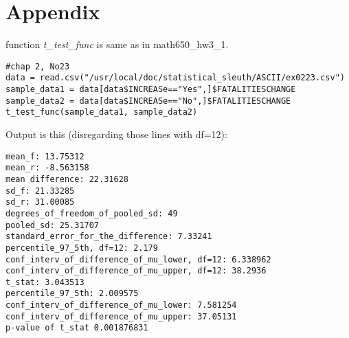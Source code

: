 \documentclass[a4paper,10pt]{article}
\begin{document}
\section{Appendix}
\label{appendix}
function \emph{t\_test\_func} is same as in math650\_hw3\_1.
\begin{verbatim}
#chap 2, No23
data = read.csv("/usr/local/doc/statistical_sleuth/ASCII/ex0223.csv")
sample_data1 = data[data$INCREASe=="Yes",]$FATALITIESCHANGE
sample_data2 = data[data$INCREASe=="No",]$FATALITIESCHANGE
t_test_func(sample_data1, sample_data2)
\end{verbatim}

Output is this (disregarding those lines with df=12):
\begin{verbatim}
mean_f: 13.75312
mean_r: -8.563158
mean difference: 22.31628
sd_f: 21.33285
sd_r: 31.00085
degrees_of_freedom_of_pooled_sd: 49
pooled_sd: 25.31707
standard_error_for_the_difference: 7.33241
percentile_97_5th, df=12: 2.179
conf_interv_of_difference_of_mu_lower, df=12: 6.338962
conf_interv_of_difference_of_mu_upper, df=12: 38.2936
t_stat: 3.043513
percentile_97_5th: 2.009575
conf_interv_of_difference_of_mu_lower: 7.581254
conf_interv_of_difference_of_mu_upper: 37.05131
p-value of t_stat 0.001876831
\end{verbatim}
\end{document}
